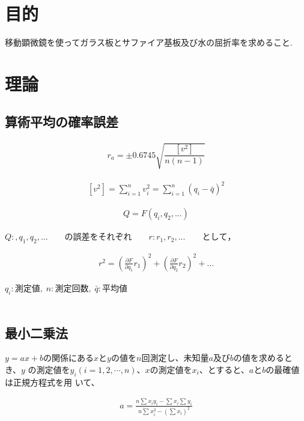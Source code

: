 \documentclass[a4paper,1pt]{jsarticle}
\begin{document}
\section{目的}
移動顕微鏡を使ってガラス板とサファイア基板及び水の屈折率を求めること.\\





\section{理論}

 \subsection*{算術平均の確率誤差}

 \begin{eqnarray}
  \label{kakuritugosa}
  r_a=\pm0.6745\sqrt{\dfrac{[v^2]}{n(n-1)}}
\end{eqnarray}

\begin{eqnarray}
  \label{kaisekizansa}
  [v^2]=\sum_{i=1}^n v_i^2=\sum_{i=1}^n(q_i-\bar{q})^2
\end{eqnarray}

\begin{eqnarray}
  \label{kaisekizansa}
  Q=F(q_i,q_2,...)
\end{eqnarray}


  $Q:,q_1,q_2,\dots\qquad の誤差をそれぞれ\qquad r:r_1,r_2,...\qquad として，$

  \begin{eqnarray}
    \label{kaisekizansa}
    r^2=(\frac{\partial F}{\partial q_1}r_1)^2+(\frac{\partial F}{\partial q_2}r_2)^2+\dots
  \end{eqnarray}

  


  $q_i:測定値,\; n:測定回数,\; \bar{q}:平均値$\\\\

  \subsection*{最小二乗法}
  $y=ax+b$の関係にある$x$と$y$の値を$n$回測定し、未知量$a$及び$b$の値を求めるとき、$y$
      の測定値を$y_i(i=1,2,\cdots,n)$、$x$の測定値を$x_i$、とすると、$a$と$b$の最確値は正規方程式を用
      いて、
     

      \begin{eqnarray}
        \label{kaisekiA}
        a=\frac{n\sum{}^{}x_iy_i-\sum{}^{}x_i \sum{}^{}y_i}{n\sum{}^{}x_i^2-(\sum{}^{}x_i)^2}
      \end{eqnarray}
\end{document}
